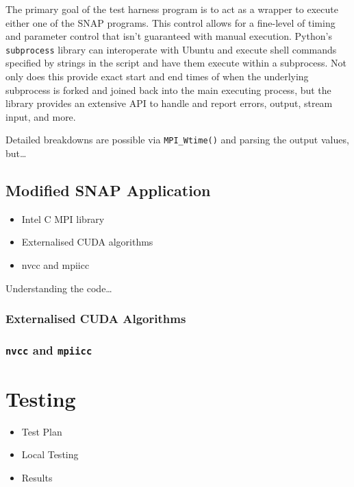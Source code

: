 \documentclass[conference]{IEEEtran}
\begin{document}
The primary goal of the test harness program is to act as a wrapper to execute either one of the SNAP programs. This control allows for a fine-level of timing and parameter control that isn't guaranteed with manual execution. Python's \texttt{subprocess} library can interoperate with Ubuntu and execute shell commands specified by strings in the script and have them execute within a subprocess. Not only does this provide exact start and end times of when the underlying subprocess is forked and joined back into the main executing process, but the library provides an extensive API to handle and report errors, output, stream input, and more.



Detailed breakdowns are possible via \texttt{MPI\_Wtime()} and parsing the output values, but\dots



\subsection{Modified SNAP Application}
\label{subsec:imp_mod_snap}

\begin{itemize}
    \item Intel C MPI library
    \item Externalised CUDA algorithms
    \item nvcc and mpiicc
\end{itemize}

Understanding the code\dots

\subsubsection{Externalised CUDA Algorithms}

\subsubsection{\texttt{nvcc} and \texttt{mpiicc}}


\section{Testing}
\label{sec:testing}

\begin{itemize}
    \item Test Plan
    \item Local Testing
    \item Results
\end{itemize}
\end{document}
